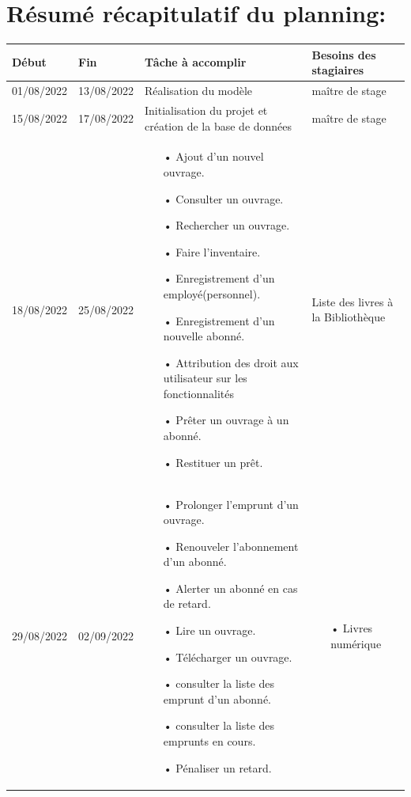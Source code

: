 \documentclass[12pt,a4paper]{article}
\begin{document}
\section{Résumé récapitulatif du planning:}
\begin{center}
\begin{tabular}{|p{2.2cm}|p{2.2cm}|p{6.5cm}|p{6.5cm}|}
\hline 
\textbf{Début} & \textbf{Fin} & \textbf{Tâche à accomplir} & \textbf{Besoins des stagiaires} \\ 
\hline 
01/08/2022 & 13/08/2022 & Réalisation du modèle & maître de stage\\ 
\hline 
15/08/2022 & 17/08/2022 & Initialisation du projet et création de la base de données & maître de stage \\ 
\hline
18/08/2022 & 25/08/2022 & \begin{itemize}
\item[•] Ajout d'un nouvel ouvrage.
\item[•] Consulter un ouvrage.
\item[•] Rechercher un ouvrage.
\item[•] Faire l'inventaire.
\item[•] Enregistrement d'un employé(personnel).
\item[•] Enregistrement d'un nouvelle abonné.
\item[•] Attribution des droit aux utilisateur sur les fonctionnalités
\item[•] Prêter un ouvrage à un abonné.
\item[•] Restituer un prêt.
\end{itemize} & Liste des livres à la Bibliothèque \\ 
\hline 
29/08/2022 & 02/09/2022 & \begin{itemize}
\item[•] Prolonger l'emprunt d'un ouvrage.
\item[•] Renouveler l'abonnement d'un abonné.
\item[•] Alerter un abonné en cas de retard.
\item[•] Lire un ouvrage.
\item[•] Télécharger un ouvrage.
\item[•] consulter la liste des emprunt d'un abonné.
\item[•] consulter la liste des emprunts en cours.
\item[•] Pénaliser un retard.
\end{itemize} & 
\begin{itemize}
\item[•] Livres numérique

\end{itemize}
\end{tabular}
\end{center}
\end{document}

